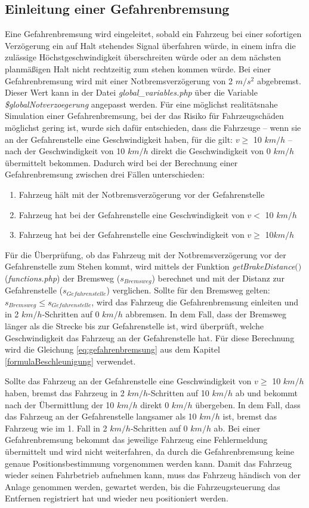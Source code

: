 \subsection{Einleitung einer Gefahrenbremsung} \label{notbremsung}
Eine Gefahrenbremsung wird eingeleitet, sobald ein Fahrzeug bei einer sofortigen Verzögerung ein auf Halt stehendes Signal überfahren würde, in einem \ac{infra} die zulässige Höchstgeschwindigkeit überschreiten würde oder an dem nächsten planmäßigen Halt nicht rechtzeitig zum stehen kommen würde. Bei einer Gefahrenbremsung wird mit einer Notbremsverzögerung von 2 $m/s^2$ abgebremst. Dieser Wert kann in der Datei \textit{global\_variables.php} über die Variable \textit{\$globalNotverzoegerung} angepasst werden. Für eine möglichst realitätsnahe Simulation einer Gefahrenbremsung, bei der das Risiko für Fahrzeugschäden möglichst gering ist, wurde sich dafür entschieden, dass die Fahrzeuge -- wenn sie an der Gefahrenstelle eine Geschwindigkeit haben, für die gilt: $v\geq$ 10 $km/h$ -- nach der Geschwindigkeit von 10 $km/h$ direkt die Geschwindigkeit von 0 $km/h$ übermittelt bekommen. Dadurch wird bei der Berechnung einer Gefahrenbremsung zwischen drei Fällen unterschieden:
\begin{enumerate}
\item Fahrzeug hält mit der Notbremsverzögerung vor der Gefahrenstelle
\item Fahrzeug hat bei der Gefahrenstelle eine Geschwindigkeit von $v<$ 10 $km/h$
\item Fahrzeug hat bei der Gefahrenstelle eine Geschwindigkeit von $v\geq$ 10$ km/h$
\end{enumerate}
Für die Überprüfung, ob das Fahrzeug mit der Notbremsverzögerung vor der Gefahrenstelle zum Stehen kommt, wird mittels der Funktion \textit{getBrakeDistance$($$)$} (\textit{functions.php}) der Bremsweg ($s_{Bremsweg}$) berechnet und mit der Distanz zur Gefahrenstelle ($s_{Gefahrenstelle}$) verglichen. Sollte für den Bremsweg gelten: $s_{Bremsweg}\leq s_{Gefahrenstelle}$, wird das Fahrzeug die Gefahrenbremsung einleiten und in 2 $km/h$-Schritten auf 0 $km/h$ abbremsen. In dem Fall, dass der Bremsweg länger als die Strecke bis zur Gefahrenstelle ist, wird überprüft, welche Geschwindigkeit das Fahrzeug an der Gefahrenstelle hat. Für diese Berechnung wird die Gleichung \ref{eq:gefahrenbremsung} aus dem Kapitel \ref{formulaBeschleunigung} verwendet. 

Sollte das Fahrzeug an der Gefahrenstelle eine Geschwindigkeit von $v\geq$ 10 $km/h$ haben, bremst das Fahrzeug in 2 $km/h$-Schritten auf 10 $km/h$ ab und bekommt nach der Übermittlung der 10 $km/h$ direkt 0 $km/h$ übergeben. In dem Fall, dass das Fahrzeug an der Gefahrenstelle langsamer als 10 $km/h$ ist, bremst das Fahrzeug wie im 1. Fall in 2 $km/h$-Schritten auf 0 $km/h$ ab. Bei einer Gefahrenbremsung bekommt das jeweilige Fahrzeug eine Fehlermeldung übermittelt und wird nicht weiterfahren, da durch die Gefahrenbremsung keine genaue Positionsbestimmung vorgenommen werden kann. Damit das Fahrzeug wieder seinen Fahrbetrieb aufnehmen kann, muss das Fahrzeug händisch von der Anlage genommen werden, gewartet werden, bis die Fahrzeugsteuerung das Entfernen registriert hat und wieder neu positioniert werden.